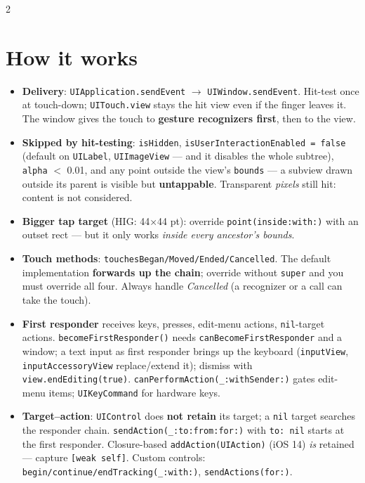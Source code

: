 \documentclass[8pt]{extarticle}
\newcommand\ct[1]{\texttt{#1}}
\begin{document}
\begin{multicols}{2}
\small\raggedright

\section{How it works}
\begin{itemize}
  \item \textbf{Delivery}: \ct{UIApplication.sendEvent} $\to$ \ct{UIWindow.sendEvent}. Hit-test
        once at touch-down; \ct{UITouch.view} stays the hit view even if the finger leaves it.
        The window gives the touch to \textbf{gesture recognizers first}, then to the view.
  \item \textbf{Skipped by hit-testing}: \ct{isHidden}, \ct{isUserInteractionEnabled = false}
        (default on \ct{UILabel}, \ct{UIImageView} — and it disables the whole subtree),
        \ct{alpha} $<$ 0.01, and any point outside the view's \ct{bounds} — a subview drawn
        outside its parent is visible but \textbf{untappable}. Transparent \emph{pixels} still
        hit: content is not considered.
  \item \textbf{Bigger tap target} (HIG: 44×44 pt): override \ct{point(inside:with:)} with
        an outset rect — but it only works \emph{inside every ancestor's bounds}.
  \item \textbf{Touch methods}: \ct{touchesBegan/Moved/Ended/Cancelled}. The default
        implementation \textbf{forwards up the chain}; override without \ct{super} and you
        must override all four. Always handle \emph{Cancelled} (a recognizer or a call can
        take the touch).
  \item \textbf{First responder} receives keys, presses, edit-menu actions, \ct{nil}-target
        actions. \ct{becomeFirstResponder()} needs \ct{canBecomeFirstResponder} and a window;
        a text input as first responder brings up the keyboard (\ct{inputView},
        \ct{inputAccessoryView} replace/extend it); dismiss with \ct{view.endEditing(true)}.
        \ct{canPerformAction(\_:withSender:)} gates edit-menu items; \ct{UIKeyCommand} for
        hardware keys.
  \item \textbf{Target–action}: \ct{UIControl} does \textbf{not retain} its target; a
        \ct{nil} target searches the responder chain. \ct{sendAction(\_:to:from:for:)} with
        \ct{to: nil} starts at the first responder. Closure-based \ct{addAction(UIAction)}
        (iOS 14) \emph{is} retained — capture \ct{[weak self]}. Custom controls:
        \ct{begin/continue/endTracking(\_:with:)}, \ct{sendActions(for:)}.
\end{itemize}


\end{multicols}
\end{document}

